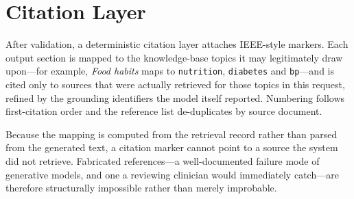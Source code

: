 \section{Citation Layer}
\label{sec:citations}

After validation, a deterministic citation layer attaches IEEE-style markers.
Each output section is mapped to the knowledge-base topics it may legitimately
draw upon---for example, \emph{Food habits} maps to \texttt{nutrition},
\texttt{diabetes} and \texttt{bp}---and is cited only to sources that were
actually retrieved for those topics in this request, refined by the grounding
identifiers the model itself reported. Numbering follows first-citation order
and the reference list de-duplicates by source document.

Because the mapping is computed from the retrieval record rather than parsed
from the generated text, a citation marker cannot point to a source the system
did not retrieve. Fabricated references---a well-documented failure mode of
generative models, and one a reviewing clinician would immediately catch---are
therefore structurally impossible rather than merely improbable.

